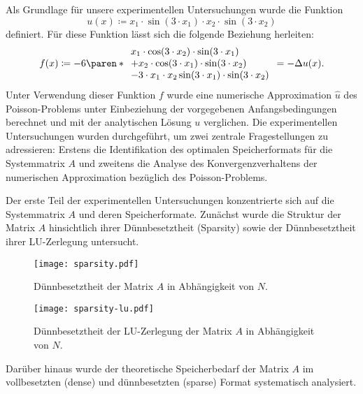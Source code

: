 \documentclass{scrartcl}
\begin{document}
Als Grundlage für unsere experimentellen Untersuchungen wurde die Funktion
\begin{equation}\label{eq:u}
    u(x) \coloneq x_1 \cdot \sin(3 \cdot x_1) \cdot x_2 \cdot \sin(3 \cdot x_2)
\end{equation}
definiert. Für diese Funktion lässt sich die folgende Beziehung herleiten:
\begin{equation}\label{eq:f}
    f(x) \coloneq -6 \paren*{\begin{array}{l}
            x_1 \cdot \cos(3 \cdot x_2) \cdot \sin(3 \cdot x_1)   \\
            + x_2 \cdot \cos(3 \cdot x_1) \cdot \sin(3 \cdot x_2) \\
            - 3 \cdot x_1 \cdot x_2 \sin(3 \cdot x_1) \cdot \sin(3 \cdot x_2)
        \end{array}}
    = -\Delta u(x).
\end{equation}
Unter Verwendung dieser Funktion \(f\) wurde eine numerische Approximation \(\hat u\)
des Poisson-Problems unter Einbeziehung der vorgegebenen Anfangsbedingungen
berechnet und mit der analytischen Lösung \(u\) verglichen. Die experimentellen
Untersuchungen wurden durchgeführt, um zwei zentrale Fragestellungen zu adressieren:
Erstens die Identifikation des optimalen Speicherformats für die Systemmatrix \(A\)
und zweitens die Analyse des Konvergenzverhaltens der numerischen Approximation
bezüglich des Poisson-Problems.

Der erste Teil der experimentellen Untersuchungen konzentrierte sich auf die
Systemmatrix \(A\) und deren Speicherformate. Zunächst wurde die Struktur der
Matrix \(A\) hinsichtlich ihrer Dünnbesetztheit (Sparsity) sowie der
Dünnbesetztheit ihrer LU-Zerlegung untersucht.

\begin{figure}[H]\label{fig:sparsity}
    \centering
    \texttt{[image: sparsity.pdf]}
    \caption{ Dünnbesetztheit der Matrix \(A\) in Abhängigkeit von \(N\).}
\end{figure}

\begin{figure}[H]\label{fig:sparsity-lu}
    \centering
    \texttt{[image: sparsity-lu.pdf]}
    \caption{
        Dünnbesetztheit der LU-Zerlegung der Matrix \(A\) in Abhängigkeit von
        \(N\).
    }
\end{figure}

Darüber hinaus wurde der theoretische Speicherbedarf der Matrix \(A\) im
vollbesetzten (dense) und dünnbesetzten (sparse) Format systematisch
analysiert.
\end{document}
